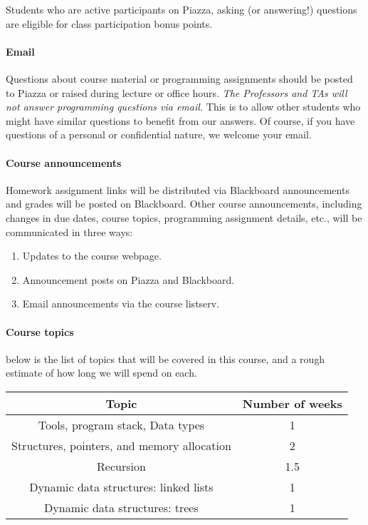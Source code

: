 \documentclass{article}
\begin{document}
Students who are active participants on Piazza, asking (or answering!) questions are eligible for class participation bonus points.

\paragraph{Email} Questions about course material or programming assignments should be posted to Piazza or raised during lecture or office hours. {\em The Professors and TAs will not answer programming questions via email.} This is to allow other students who might have similar questions to benefit from our answers. Of course, if you have questions of a personal or confidential nature, we welcome your email.

\paragraph{Course announcements} Homework assignment links will be distributed via Blackboard announcements and grades will be posted on Blackboard. Other course announcements, including changes in due dates, course topics, programming assignment details, etc., will be communicated in three ways:
\begin{enumerate}
\item Updates to the course webpage.
\item Announcement posts on Piazza and Blackboard.
\item Email announcements via the course listserv.
\end{enumerate}

\paragraph{Course topics} below is the list of topics that will be covered in this course, and a rough estimate of how long we will spend on each. 
\begin{table}[H]
\centering
\begin{tabulary}{\linewidth}{|c|c|} \hline
Topic & Number of weeks \\ \hline
Tools, program stack, Data types & 1 \\ \hline
Structures, pointers, and memory allocation & 2 \\ \hline
Recursion & 1.5 \\ \hline
Dynamic data structures: linked lists & 1 \\ \hline
Dynamic data structures: trees & 1 \\
\hline
\end{tabulary}
\end{table}
\end{document}
